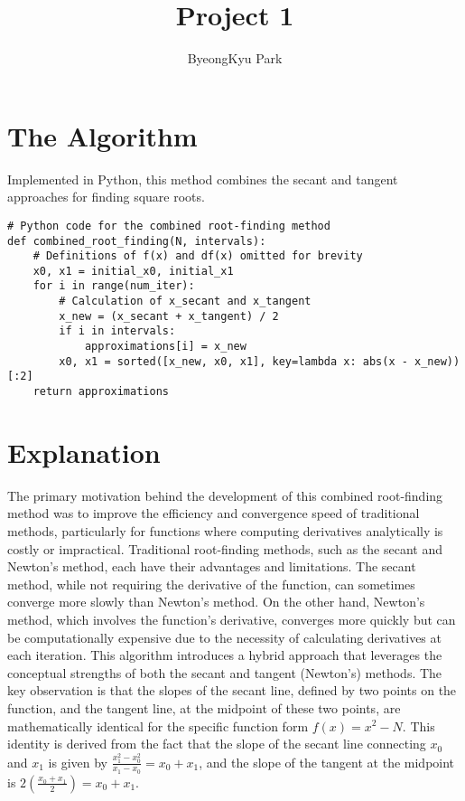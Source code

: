 \documentclass[10pt]{article}
\begin{document}
    
\title{Project 1}
\date{}
\author{ByeongKyu Park}

\maketitle

\section*{The Algorithm}

Implemented in Python, this method combines the secant and tangent approaches for finding square roots.


\begin{Verbatim}
# Python code for the combined root-finding method
def combined_root_finding(N, intervals):
    # Definitions of f(x) and df(x) omitted for brevity
    x0, x1 = initial_x0, initial_x1
    for i in range(num_iter):
        # Calculation of x_secant and x_tangent
        x_new = (x_secant + x_tangent) / 2
        if i in intervals:
            approximations[i] = x_new
        x0, x1 = sorted([x_new, x0, x1], key=lambda x: abs(x - x_new))[:2]
    return approximations
\end{Verbatim}

\section*{Explanation}

The primary motivation behind the development of this combined root-finding method was to improve the efficiency and convergence speed of traditional methods, particularly for functions where computing derivatives analytically is costly or impractical. Traditional root-finding methods, such as the secant and Newton's method, each have their advantages and limitations. The secant method, while not requiring the derivative of the function, can sometimes converge more slowly than Newton's method. On the other hand, Newton's method, which involves the function's derivative, converges more quickly but can be computationally expensive due to the necessity of calculating derivatives at each iteration. 
This algorithm introduces a hybrid approach that leverages the conceptual strengths of both the secant and tangent (Newton's) methods. The key observation is that the slopes of the secant line, defined by two points on the function, and the tangent line, at the midpoint of these two points, are mathematically identical for the specific function form \(f(x) = x^2 - N\). This identity is derived from the fact that the slope of the secant line connecting \(x_0\) and \(x_1\) is given by \(\frac{x_1^2 - x_0^2}{x_1 - x_0} = x_0 + x_1\), and the slope of the tangent at the midpoint is \(2\left(\frac{x_0 + x_1}{2}\right) = x_0 + x_1\). 
\end{document}
